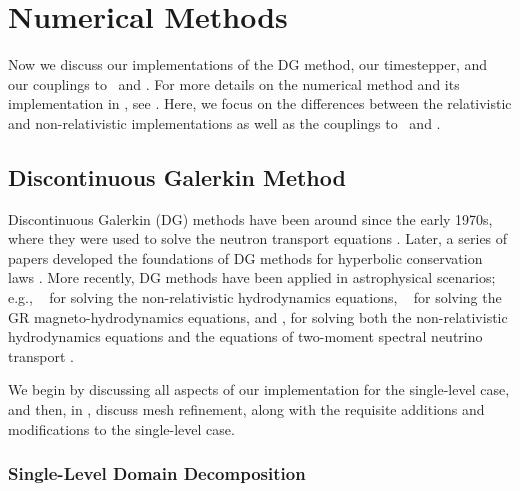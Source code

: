 \section{Numerical Methods}

Now we discuss our implementations of the DG method,
our timestepper, and our couplings to \poseidon\ and \amrex.
For more details on the numerical method and its implementation in \thornado,
see \citet{ebd2019,dem2020,pbe2021}.
Here, we focus on the differences between the
relativistic and non-relativistic implementations as well as the couplings
to \poseidon\ and \amrex.

\subsection{Discontinuous Galerkin Method}

Discontinuous Galerkin (DG) methods have been around since the early 1970s,
where they were used to solve the neutron transport equations \citep{rh1973}.
Later, a series of papers developed the foundations of
DG methods for hyperbolic conservation laws
\citep{cs1988,cs1989,cls1989,chs1990,cs1998}.
More recently, DG methods have been applied in astrophysical scenarios; e.g.,
\tenet\ \citep{sbc2015}
for solving the non-relativistic hydrodynamics equations,
\spectre\ \citep{kff2017}
for solving the GR magneto-hydrodynamics equations,
and \thornado, for solving both the non-relativistic hydrodynamics equations
\citep{ebd2019,pbe2021} and the equations of two-moment spectral neutrino
transport \citep{ceh2019,lec2021,leh2023}.

We begin by discussing all aspects of our implementation for the single-level
case, and then, in , discuss mesh refinement, along with the
requisite additions and modifications to the single-level case.

\subsubsection{Single-Level Domain Decomposition}
\label{sss.sldd}

